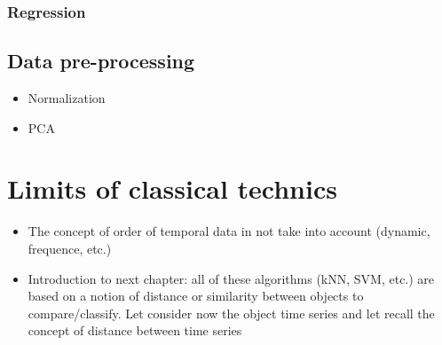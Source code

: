%
%


\subsubsection{Regression}


\subsection{Data pre-processing}
\begin{itemize}
	\item Normalization
	\item PCA
\end{itemize}

\section{Limits of classical technics}
\begin{itemize}
	\item The concept of order of temporal data in not take into account (dynamic, frequence, etc.)
	\item Introduction to next chapter: all of these algorithms (kNN, SVM, etc.) are based on a notion of distance or similarity between objects to compare/classify. Let consider now the object time series and let recall the concept of distance between time series
\end{itemize}

